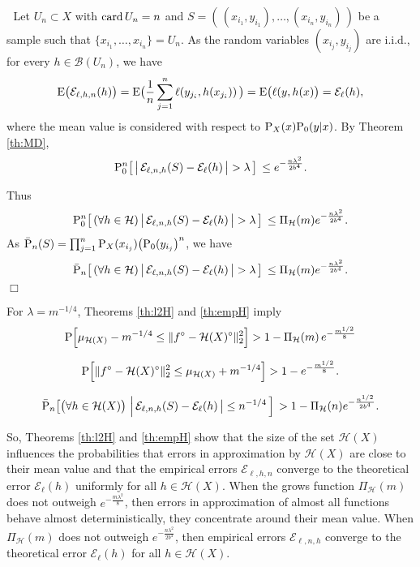 \documentclass{elsarticle}
\def\n{\noindent}
\def\bop{\noindent {\bf Proof.}$ \;$ }
\def\eop{\hfill $\Box$ \vspace{0.3 true cm}}
\def\card{{\rm card}}
\def\P{{\rm P}}
\def\E{{\rm E}}
\def\cE{{\mathcal E}}
\def\cH{{\mathcal H}}
\def\cB{{\mathcal B}}
\def\n{\noindent}
\def\bop{\noindent {\bf Proof.\ }}
\def\card{{\rm card}}
\def\bop{\noindent {\bf Proof.}$ \;$ }
\def\eop{\hfill $\Box$ \vspace{0.5cm}}
\begin{document}
\bop
Let $U_n \subset X$ with $\card \, U_n =n$ and
$S = ( \, (x_{i_1},y_{i_1}), \dots, (x_{i_n}, y_{i_n}) \, )$ be a sample such that $\{x_{i_1}, \dots, x_{i_n}\}=U_n$. As the random variables $(x_{i_j},y_{i_j})$ are i.i.d., for every $h\in \cB(U_n)$,
we have
$$\E \bigl (  \cE_{\ell, h,n}(h) \bigr ) = \E \bigl( \frac{1}{n}
\sum_{j=1}^n \ell(y_{j_i}, h(x_{j_i})) \, \bigr )  =
 \E \bigl (\ell(y,h(x) \bigr ) = \cE_{\ell}(h),$$
 \n where the mean value is considered with respect to $\P_X(x)\P_0(y|x)$.
By Theorem \ref{th:MD},
$$ \P_0^n \bigl [ \,  \left | \, \cE_{\ell,n,h}(S) - \cE_{\ell}(h) \, \bigr  |  > \lambda \, \right ]\, \leq e^{-\frac{n \lambda^2}{2b^4}}.$$

\n Thus
$$ \P_0^n \bigl [ \, (\forall h \in \cH)  \left | \, \cE_{\ell,n,h}(S) - \cE_{\ell}(h) \, \bigr  |  > \lambda \, \right ]\,  \leq\Pi_{\cH}(m) e^{-\frac{n \lambda^2}{2b^4}}.$$
\n As ${\bar \P_n} (S)=   \prod_{j=1}^n \P_X(x_{i_j}) \bigl ( \P_0(y_{i_j} \bigr )^n$, we have
$$ {\bar \P}_n \bigl [ \, (\forall h \in \cH)  \left | \, \cE_{\ell,n,h}(S) - \cE_{\ell}(h) \, \bigr  |  > \lambda \, \right ]\,  \leq \Pi_{\cH}(m) e^{-\frac{n \lambda^2}{2b^4}}.$$
\eop


\n For $\lambda = m^{-1/4}$, Theorems \ref{th:l2H} and \ref{th:empH} imply
 \begin{equation}
 \P \Bigl [ \mu_{\cH(X)} - m^{-1/4} \leq \|f^{\circ} - \cH(X)^{\circ} \|^2_2 \Bigr ] > 1 - \Pi_{\cH}(m) \, e^{-\frac{m^{1/2}}{8}}
\label{eq:l2Hi}
\end{equation}

 \begin{equation}
 \P \Bigl [ \|f^{\circ} - \cH(X)^{\circ} \|^2_2 \leq \mu_{\cH(X)} + m^{-1/4} \Bigr ] > 1 - e^{-\frac{m^{1/2}}{8}}.
\label{eq:l2Hii}
\end{equation}


\begin{equation}
{\bar \P}_n \bigl [ \bigl ( \forall h \in \cH(X) \bigr ) \,  \left | \, \cE_{\ell,n,h}(S) - \cE_{\ell}(h) \, \bigr  |  \leq n^{-1/4} \, \right ]\,  > 1-  \Pi_{\cH}(n) e^{-\frac{n^{1/2}}{2b^4}}.
\label{eq:empH}
\end{equation}



So, Theorems \ref{th:l2H} and \ref{th:empH} show that the size of the set $\cH(X)$ influences the probabilities that errors in approximation by $\cH(X)$ are close to their mean value and that the empirical errors $\cE_{\ell,h,n}$ converge to the theoretical error $\cE_{\ell}(h)$ uniformly for all $h \in \cH(X)$. When the grows function $\Pi_{\cH}(m)$ does not outweigh $e^{-\frac{m{\lambda}^2}{8}}$, then errors in approximation of almost all functions behave almost deterministically, they concentrate around their mean value. When $\Pi_{\cH}(m)$ does not outweigh  $e^{-\frac{n{\lambda}^2}{2b^4}}$,
then empirical errors $\cE_{\ell, n,h}$ converge to the theoretical error $\cE_{\ell}(h)$ for all $h \in \cH(X)$.
\end{document}
